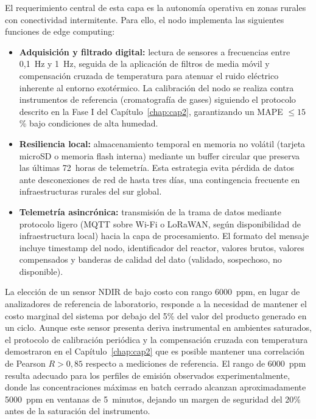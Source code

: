 El requerimiento central de esta capa es la autonomía operativa en zonas rurales con conectividad intermitente. Para ello, el nodo implementa las siguientes funciones de edge computing:

\begin{itemize}
    \item \textbf{Adquisición y filtrado digital:} lectura de sensores a frecuencias entre 0,1~Hz y 1~Hz, seguida de la aplicación de filtros de media móvil y compensación cruzada de temperatura para atenuar el ruido eléctrico inherente al entorno exotérmico. La calibración del nodo se realiza contra instrumentos de referencia (cromatografía de gases) siguiendo el protocolo descrito en la Fase I del Capítulo~\ref{chap:cap2}, garantizando un MAPE $\leq 15$\% bajo condiciones de alta humedad.
    \item \textbf{Resiliencia local:} almacenamiento temporal en memoria no volátil (tarjeta microSD o memoria flash interna) mediante un buffer circular que preserva las últimas 72~horas de telemetría. Esta estrategia evita pérdida de datos ante desconexiones de red de hasta tres días, una contingencia frecuente en infraestructuras rurales del sur global.
    \item \textbf{Telemetría asincrónica:} transmisión de la trama de datos mediante protocolo ligero (MQTT sobre Wi-Fi o LoRaWAN, según disponibilidad de infraestructura local) hacia la capa de procesamiento. El formato del mensaje incluye timestamp del nodo, identificador del reactor, valores brutos, valores compensados y banderas de calidad del dato (validado, sospechoso, no disponible).
\end{itemize}

La elección de un sensor NDIR de bajo costo con rango 6000~ppm, en lugar de analizadores de referencia de laboratorio, responde a la necesidad de mantener el costo marginal del sistema por debajo del 5\% del valor del producto generado en un ciclo. Aunque este sensor presenta deriva instrumental en ambientes saturados, el protocolo de calibración periódica y la compensación cruzada con temperatura demostraron en el Capítulo~\ref{chap:cap2} que es posible mantener una correlación de Pearson $R > 0{,}85$ respecto a mediciones de referencia. El rango de 6000~ppm resulta adecuado para los perfiles de emisión observados experimentalmente, donde las concentraciones máximas en batch cerrado alcanzan aproximadamente 5000~ppm en ventanas de 5~minutos, dejando un margen de seguridad del 20\% antes de la saturación del instrumento.

